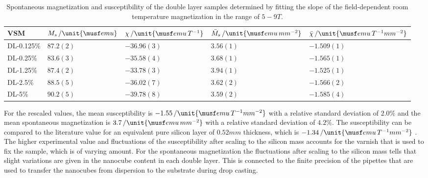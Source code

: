 \documentclass[\main/dresen_thesis.tex]{subfiles}
\begin{document}
    \begin{table}[!htbp]
      \centering
      \caption{\label{tab:doubleLayers:RTVSM:parameters} Spontaneous magnetization and susceptibility of the double layer samples determined by fitting the slope of the field-dependent room temperature magnetization in the range of $5 - 9 \unit{T}$.}
      \begin{tabular}{ l | l | l || l | l}
        \rule{0pt}{2ex} \textbf{VSM}  & $M_s \, / \unit{\musf emu}$ & $\chi \, / \unit{\musf emu \, T ^{-1}}$ & $\bar{M}_s \, / \unit{\musf emu \, mm^{-2}}$ & $\bar{\chi} \, / \unit{\musf emu \, T^{-1} mm^{-2}}$ \\
        \hline
        \rule{0pt}{2ex} DL-0.125\%   & $87.2(2)$   & $-36.96(3)$ & $3.56(1)$ & $-1.509(1)$\\
        \rule{0pt}{2ex} DL-0.25\%    & $83.6(3)$   & $-35.58(4)$ & $3.68(1)$ & $-1.565(1)$\\
        \rule{0pt}{2ex} DL-1.25\%    & $87.4(2)$   & $-33.78(3)$ & $3.94(1)$ & $-1.525(1)$\\
        \rule{0pt}{2ex} DL-2.5\%     & $88.5(5)$   & $-36.02(7)$ & $3.62(2)$ & $-1.566(2)$\\
        \rule{0pt}{2ex} DL-5\%       & $90.2(5)$   & $-39.78(8)$ & $3.59(2)$ & $-1.585(4)$\\
        \hline
      \end{tabular}
    \end{table}

    For the rescaled values, the mean susceptibility is $-1.55\, / \unit{\musf emu \, T ^{-1} mm^{-2}}$ with a relative standard deviation of $2.0 \%$  and the mean spontaneous magnetization is $3.7 \, / \unit{\musf emu \, mm^{-2}}$ with a relative standard deviation of $4.2 \%$.
    The susceptibility can be compared to the literature value for an equivalent pure silicon layer of $0.52 \unit{mm}$ thickness, which is $-1.34\, / \unit{\musf emu \, T ^{-1} mm^{-2}}$ \cite{Lide_2004_Handb}.
    The higher experimental value and fluctuations of the susceptibility after scaling to the silicon mass accounts for the varnish that is used to fix the sample, which is of varying amount.
    For the spontaneous magnetization the fluctuations after scaling to the silicon mass tells that slight variations are given in the nanocube content in each double layer.
    This is connected to the finite precision of the pipettes that are used to transfer the nanocubes from dispersion to the substrate during drop casting.
\end{document}
